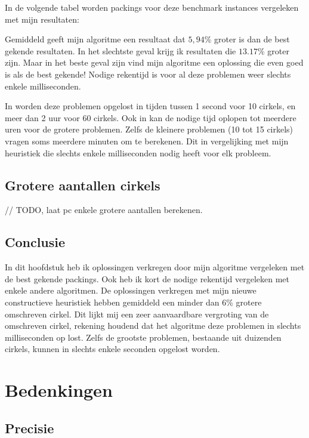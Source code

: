 \documentclass[12pt,a4paper,oneside]{book}
\begin{document}
In de volgende tabel worden packings voor deze benchmark instances vergeleken met mijn resultaten:


Gemiddeld geeft mijn algoritme een resultaat dat $5,94\%$ groter is dan de best gekende resultaten.
In het slechtste geval krijg ik resultaten die $13.17\%$ groter zijn.
Maar in het beste geval zijn vind mijn algoritme een oplossing die even goed is als de best gekende!
Nodige rekentijd is voor al deze problemen weer slechts enkele milliseconden.

In \cite{ye2013iterated} worden deze problemen opgelost in tijden tussen 1 second voor 10 cirkels, en meer dan 2 uur voor 60 cirkels.
Ook in \cite{huang2013tabu} kan de nodige tijd oplopen tot meerdere uren voor de grotere problemen.
Zelfs de kleinere problemen (10 tot 15 cirkels) vragen soms meerdere minuten om te berekenen.
Dit in vergelijking met mijn heuristiek die slechts enkele milliseconden nodig heeft voor elk probleem.

\section{Grotere aantallen cirkels}

// TODO, laat pc enkele grotere aantallen berekenen.

\section{Conclusie}

In dit hoofdstuk heb ik oplossingen verkregen door mijn algoritme vergeleken met de best gekende packings.
Ook heb ik kort de nodige rekentijd vergeleken met enkele andere algoritmen.
De oplossingen verkregen met mijn nieuwe constructieve heuristiek hebben gemiddeld een minder dan 6\% grotere omschreven cirkel.
Dit lijkt mij een zeer aanvaardbare vergroting van de omschreven cirkel, rekening houdend dat het algoritme deze problemen in slechts milliseconden op lost.
Zelfs de grootste problemen, bestaande uit duizenden cirkels, kunnen in slechts enkele seconden opgelost worden.

\chapter{Bedenkingen} \label{chap:bedenkingen}

\section{Precisie}
\end{document}
